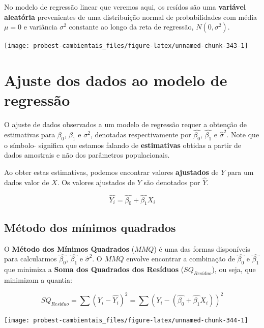 \documentclass[
]{book}
\begin{document}
No modelo de regressão linear que veremos aqui, os resídos são uma \textbf{variável aleatória} prevenientes de uma distribuição normal de probabilidades com média \(\mu = 0\) e variância \(\sigma^2\) constante ao longo da reta de regressão, \(N(0, \sigma^2)\).

\begin{center}\texttt{[image: probest-cambientais\_files/figure-latex/unnamed-chunk-343-1]} \end{center}

\hypertarget{ajuste-dos-dados-ao-modelo-de-regressuxe3o}{%
\section{Ajuste dos dados ao modelo de regressão}\label{ajuste-dos-dados-ao-modelo-de-regressuxe3o}}

O ajuste de dados observados a um modelo de regressão requer a obtenção de estimativas para \(\beta_0\), \(\beta_1\) e \(\sigma^2\), denotadas respectivamente por \(\hat{\beta_0}\), \(\hat{\beta_1}\) e \(\hat{\sigma}^2\). Note que o símbolo \(\hat{}\) significa que estamos falando de \textbf{estimativas} obtidas a partir de dados amostrais e não dos parâmetros populacionais.

Ao obter estas estimativas, podemos encontrar valores \textbf{ajustados} de \(Y\) para um dados valor de \(X\). Os valores ajustados de \(Y\) são denotados por \(\hat{Y}\).

\[\hat{Y_i} = \hat{\beta_0} + \hat{\beta_1}X_i\]

\hypertarget{muxe9todo-dos-muxednimos-quadrados}{%
\subsection{Método dos mínimos quadrados}\label{muxe9todo-dos-muxednimos-quadrados}}

O \textbf{Método dos Mínimos Quadrados} (\(MMQ\)) é uma das formas disponíveis para calcularmos \(\hat{\beta_0}\), \(\hat{\beta_1}\) e \(\hat{\sigma}^2\). O \(MMQ\) envolve encontrar a combinação de \(\hat{\beta_0}\) e \(\hat{\beta_1}\) que minimiza a \textbf{Soma dos Quadrados dos Resíduos} (\(SQ_{Resíduo}\)), ou seja, que minimizam a quantia:

\[SQ_{Resíduo} = \sum{(Y_i-\hat{Y_ i})^2} = \sum{(Y_i-(\hat{\beta_0} + \hat{\beta_1}X_i))^2}\]

\begin{center}\texttt{[image: probest-cambientais\_files/figure-latex/unnamed-chunk-344-1]} \end{center}
\end{document}

